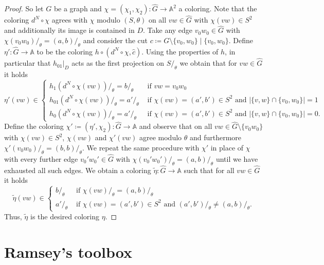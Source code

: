 \documentclass[oneside]{amsart}
\newcommand{\str}[1]{\mathbb{#1}}
\begin{document}
\begin{proof}
So let $G$ be a graph and $\chi = (\chi_1,\chi_2) \colon \hat G\to \str A^2$ a coloring. Note that the coloring $d^N\circ \chi$ agrees with $\chi$ modulo
$(S,\theta)$ on all $vw \in \hat G$ with $\chi(vw)\in S^2$ and additionally its image is contained in $D$. 
Take any edge $v_0 w_0 \in \hat G$ with $\chi(v_0 w_0)/_\theta = (a,b)/_\theta$ and consider the cut $c \coloneq G\setminus \{v_0,w_0\} \mid \{v_0,w_0\}$. 
Define $\eta'\colon \hat G\to \str A$ to be the coloring $h \circ (d^N\circ \chi,\hat c)$. Using the properties of $h$, in particular that $h_{01}|_D$ acts as the first projection on $S/_\theta$ we obtain that for $v w \in \hat G$ it holds
\begin{equation*}
    \eta'(v w)  \in
\begin{cases}
    h_{1}(d^N \circ \chi(v w))/_\theta = b/_\theta &\text{ if } v w = v_0 w_0 \\
    h_{01}(d^N \circ \chi(v w))/_\theta =  a'/_\theta &\text{ if } \chi(v w) = (a',b') \in S^2\text{ and } |\{v, w\}\cap \{v_0,w_0\}| = 1 \\
    h_{0}(d^N \circ \chi(v w))/_\theta = a'/_\theta &\text{ if } \chi(v w) = (a',b') \in S^2 \text{ and } |\{v, w\} \cap \{v_0,w_0\}| = 0.
\end{cases}
\end{equation*}
Define the coloring $\chi' \coloneq (\eta',\chi_2)\colon \hat G \to \str A$ and observe that on all $vw \in \hat G\setminus \{v_0 w_0\}$ with $\chi(vw)\in S^2$, $\chi(vw)$ and $\chi'(vw)$ agree modulo $\theta$ and furthermore $\chi'(v_0 w_0)/_\theta = (b,b)/_\theta$. 
We repeat the same procedure with $\chi'$ in place of $\chi$ with every further edge $v_0' w_0' \in \hat G$ with $\chi(v_0' w_0')/_\theta = (a,b)/_\theta$ until we have exhausted all such edges. We obtain a coloring $\tilde \eta \colon \hat G \to \str A$ such that for all $vw \in \hat G$ it holds
\begin{equation*}
        \tilde \eta(v w) \in 
\begin{cases}
    b/_\theta &\text{ if } \chi(v w)/_\theta = (a,b)/_\theta\\
    a'/_\theta &\text{ if } \chi(v w) = (a',b') \in S^2 \text{ and } (a',b')/_\theta \not= (a, b)/_\theta.
\end{cases}
\end{equation*}
Thus, $\tilde \eta$ is the desired coloring $\eta$.
\end{proof}



\section{Ramsey's toolbox}
\label{sec:ramseysToolbox}
\end{document}

